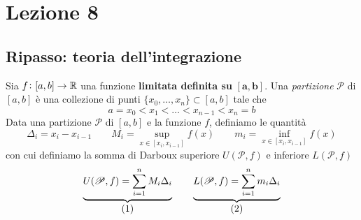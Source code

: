 \section{Lezione 8}
\subsection{Ripasso: teoria dell'integrazione}
\begin{definition}
    \label{def:8.1}
    Sia $f\colon[a,b]\to\amsbb{R}$ una funzione \textbf{limitata definita su} $\mathbf{[a,b]}$. Una \emph{partizione} $\mathscr{P}$ di $[a,b]$ è una collezione di punti $\{x_0, \dots, x_n\}\subset [a,b]$ tale che
    \[
    a=x_0 < x_1 < \dots < x_{n-1}<x_n= b
    \]
    Data una partizione $\mathscr{P}$ di $[a,b]$ e la funzione $f$, definiamo le quantità
    \begin{equation}
        \label{eq:8.1}
        \Delta_i = x_i - x_{i-1} \qquad M_i = \sup_{x\in[x_i, x_{i-1}]} f(x) \qquad m_i = \inf_{x\in[x_i, x_{i-1}]} f(x)
    \end{equation}
    con cui definiamo la somma di Darboux superiore $U(\mathscr{P}, f)$ e inferiore $L(\mathscr{P},f)$
    \[
    \underbrace{U(\mathscr{P},f) = \sum_{i=1}^n M_i \Delta_i}_{\stepcounter{equation}\mbox{(\theequation)}} \qquad \underbrace{L(\mathscr{P},f) = \sum_{i=1}^n m_i \Delta_i}_{\stepcounter{equation}\mbox{(\theequation)}}
    \]
    \addtocounter{equation}{-2}\label{eq:8.2}
    \addtocounter{equation}{0}\label{eq:8.3}
\end{definition}
